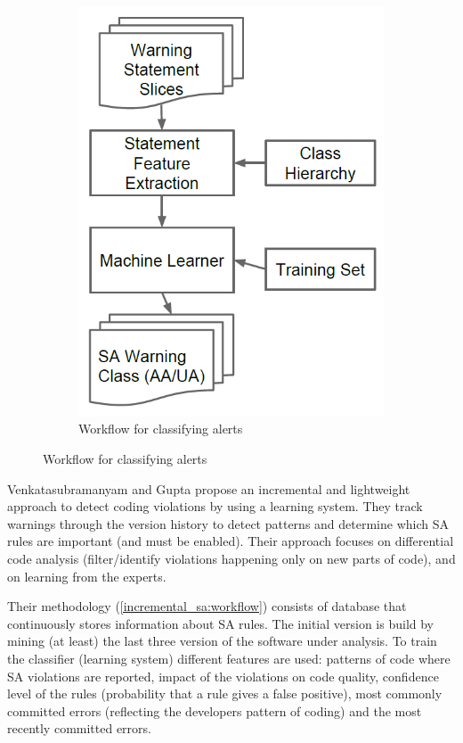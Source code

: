 \documentclass{article}
\begin{document}
\begin{figure}[H]
\begin{subfigure}{.5\textwidth}
         \includegraphics[scale=0.3]{./src/alert_patterns_workflow.png}
         \caption{Workflow for classifying alerts}\label{alert_patterns:workflow}
     \end{subfigure}
 \end{figure}


 Venkatasubramanyam and Gupta \cite{incremental_sa} propose an incremental and lightweight approach to detect coding violations by using a learning system. They track warnings through the version history to detect patterns and determine which SA rules are important (and must be enabled). Their approach focuses on differential code analysis (filter/identify violations happening only on new parts of code), and on learning from the experts.

 Their methodology (\cref{incremental_sa:workflow}) consists of database that continuously stores information about SA rules. The initial version is build by mining (at least) the last three version of the software under analysis. To train the classifier (learning system) different features are used: patterns of code where SA violations are reported, impact of the violations on code quality, confidence level of the rules (probability that a rule gives a false positive), most commonly committed errors (reflecting the developers pattern of coding) and the most recently committed errors.
\end{document}
